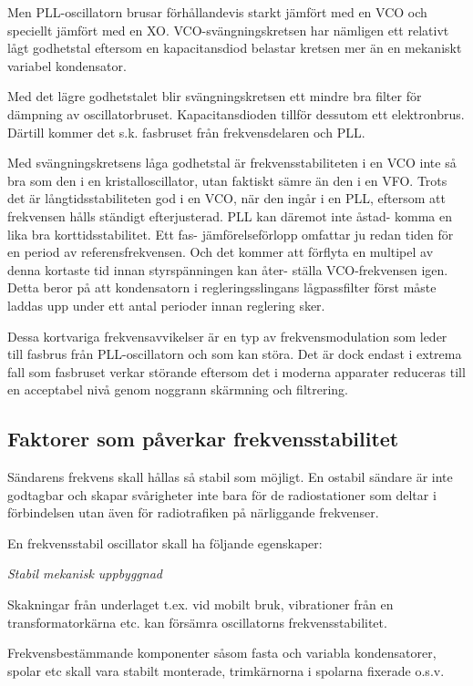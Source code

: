 Men PLL-oscillatorn brusar förhållandevis starkt jämfört med en VCO
och speciellt jämfört med en XO. VCO-svängningskretsen har nämligen
ett relativt lågt godhetstal eftersom en kapacitansdiod belastar
kretsen mer än en mekaniskt variabel kondensator.

Med det lägre godhetstalet blir svängningskretsen ett mindre bra
filter för dämpning av oscillatorbruset. Kapacitansdioden tillför
dessutom ett elektronbrus. Därtill kommer det s.k. fasbruset från
frekvensdelaren och PLL.

Med svängningskretsens låga godhetstal är frekvensstabiliteten i en
VCO inte så bra som den i en kristalloscillator, utan faktiskt sämre
än den i en VFO.  Trots det är långtidsstabiliteten god i en VCO,
när den ingår i en PLL, eftersom att frekvensen hålls ständigt
efterjusterad. PLL kan däremot inte åstad- komma en lika bra
korttidsstabilitet. Ett fas- jämförelseförlopp omfattar ju redan tiden
för en period av referensfrekvensen. Och det kommer att förflyta en
multipel av denna kortaste tid innan styrspänningen kan åter- ställa
VCO-frekvensen igen. Detta beror på att kondensatorn i
regleringsslingans lågpassfilter först måste laddas upp under ett
antal perioder innan reglering sker.

Dessa kortvariga frekvensavvikelser är en typ av frekvensmodulation
som leder till fasbrus från PLL-oscillatorn och som kan störa. Det är
dock endast i extrema fall som fasbruset verkar störande eftersom det
i moderna apparater reduceras till en acceptabel nivå genom noggrann
skärmning och filtrering.

\subsection{Faktorer som påverkar frekvensstabilitet}

Sändarens frekvens skall hållas så stabil som möjligt. En ostabil
sändare är inte godtagbar och skapar svårigheter inte bara för de
radiostationer som deltar i förbindelsen utan även för radiotrafiken
på närliggande frekvenser.

En frekvensstabil oscillator skall ha följande egenskaper:

\emph{Stabil mekanisk uppbyggnad}

Skakningar från underlaget t.ex. vid mobilt bruk, vibrationer från en
transformatorkärna etc. kan försämra oscillatorns frekvensstabilitet.

Frekvensbestämmande komponenter såsom fasta och variabla
kondensatorer, spolar etc skall vara stabilt monterade, trimkärnorna i
spolarna fixerade o.s.v.

